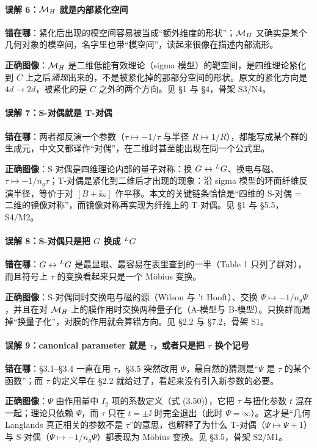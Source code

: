 \paragraph{误解 6：$\mathcal{M}_H$ 就是内部紧化空间}
\mbox{}\par\noindent
\textbf{错在哪}：紧化后出现的模空间容易被当成“额外维度的形状”；$\mathcal{M}_H$ 又确实是某个几何对象的模空间，名字里也带“模空间”，读起来很像在描述内部流形。
\par\noindent
\textbf{正确图像}：$\mathcal{M}_H$ 是二维低能有效理论（sigma 模型）的靶空间，是四维理论紧化到 $C$ 上之后\emph{涌现}出来的，不是被紧化掉的那部分空间的形状。原文的紧化方向是 $4d\to2d$，被紧化的是 $C$ 之外的两个方向。见 \S1 与 \S4，骨架 S3/N4。

\paragraph{误解 7：S-对偶就是 T-对偶}
\mbox{}\par\noindent
\textbf{错在哪}：两者都反演一个参数（$\tau\mapsto-1/\tau$ 与半径 $R\mapsto1/R$），都能写成某个群的生成元，中文又都译作“对偶”，在二维时甚至能出现在同一个公式里。
\par\noindent
\textbf{正确图像}：S-对偶是四维理论内部的量子对称：换 $G\leftrightarrow{}^{L}G$、换电与磁、$\tau\mapsto-1/n_g\tau$；T-对偶是紧化到二维后才出现的现象：沿 sigma 模型的环面纤维反演半径，等价于对 $[B+\ii\omega]$ 作平移。本文的关键链条恰恰是“四维的 S-对偶 = 二维的镜像对称”，而镜像对称再实现为纤维上的 T-对偶。见 \S1 与 \S5.5，S4/M2。

\paragraph{误解 8：S-对偶只是把 $G$ 换成 ${}^{L}G$}
\mbox{}\par\noindent
\textbf{错在哪}：$G\leftrightarrow{}^{L}G$ 是最显眼、最容易在表里查到的一半（Table 1 只列了群对），而且符号上 $\tau$ 的变换看起来只是一个 Möbius 变换。
\par\noindent
\textbf{正确图像}：S-对偶同时交换电与磁的源（Wilson 与 't Hooft）、交换 $\Psi\mapsto-1/n_g\Psi$，并且在对 $\mathcal{M}_H$ 上的膜作用时交换两种量子化（A-模型与 B-模型）。只换群而漏掉“换量子化”，对膜的作用就会算错方向。见 \S2.2 与 \S7.2，骨架 S1。

\paragraph{误解 9：canonical parameter 就是 $\tau$，或者只是把 $\tau$ 换个记号}
\mbox{}\par\noindent
\textbf{错在哪}：\S3.1--\S3.4 一直在用 $\tau$，\S3.5 突然改用 $\Psi$，最自然的猜测是“$\Psi$ 是 $\tau$ 的某个函数”；而 $\tau$ 的定义早在 \S2.2 就给过了，看起来没有引入新参数的必要。
\par\noindent
\textbf{正确图像}：$\Psi$ 由作用量中 $I_2$ 项的系数定义（式 (3.50)），它把 $\tau$ 与扭化参数 $t$ 混在一起；理论只依赖 $\Psi$，而 $\tau$ 只在 $t=\pm\ii$ 时完全退出（此时 $\Psi=\infty$）。这才是“几何 Langlands 真正相关的参数不是 $\tau$”的意思，也解释了为什么 T-对偶（$\Psi\mapsto\Psi+1$）与 S-对偶（$\Psi\mapsto-1/n_g\Psi$）都表现为 Möbius 变换。见 \S3.5，骨架 S2/M1。

